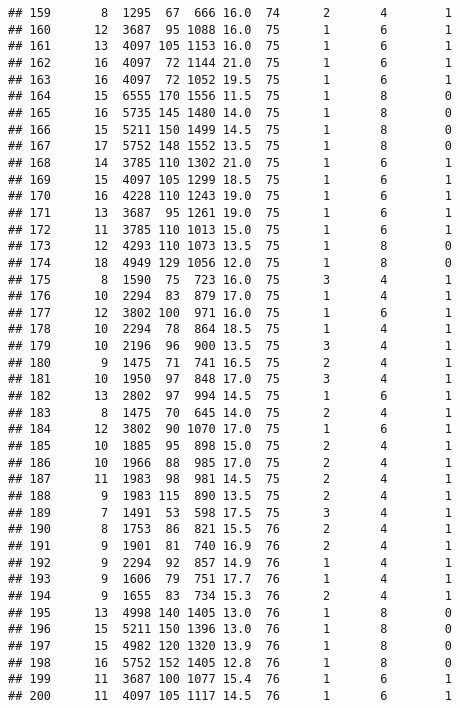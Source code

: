 \documentclass{article}\usepackage[]{graphicx}\usepackage[]{color}
\makeatletter
\newenvironment{kframe}{%
 \def\at@end@of@kframe{}%
 \ifinner\ifhmode%
  \def\at@end@of@kframe{\end{minipage}}%
  \begin{minipage}{\columnwidth}%
 \fi\fi%
 \def\FrameCommand##1{\hskip\@totalleftmargin \hskip-\fboxsep
 \colorbox{shadecolor}{##1}\hskip-\fboxsep
     \hskip-\linewidth \hskip-\@totalleftmargin \hskip\columnwidth}%
 \MakeFramed {\advance\hsize-\width
   \@totalleftmargin\z@ \linewidth\hsize
   \@setminipage}}%
 {\par\unskip\endMakeFramed%
 \at@end@of@kframe}
\newenvironment{knitrout}{}{} %
\makeatother
\begin{document}
\begin{knitrout}
\begin{kframe}
\begin{verbatim}
## 159       8  1295  67  666 16.0  74      2       4        1
## 160      12  3687  95 1088 16.0  75      1       6        1
## 161      13  4097 105 1153 16.0  75      1       6        1
## 162      16  4097  72 1144 21.0  75      1       6        1
## 163      16  4097  72 1052 19.5  75      1       6        1
## 164      15  6555 170 1556 11.5  75      1       8        0
## 165      16  5735 145 1480 14.0  75      1       8        0
## 166      15  5211 150 1499 14.5  75      1       8        0
## 167      17  5752 148 1552 13.5  75      1       8        0
## 168      14  3785 110 1302 21.0  75      1       6        1
## 169      15  4097 105 1299 18.5  75      1       6        1
## 170      16  4228 110 1243 19.0  75      1       6        1
## 171      13  3687  95 1261 19.0  75      1       6        1
## 172      11  3785 110 1013 15.0  75      1       6        1
## 173      12  4293 110 1073 13.5  75      1       8        0
## 174      18  4949 129 1056 12.0  75      1       8        0
## 175       8  1590  75  723 16.0  75      3       4        1
## 176      10  2294  83  879 17.0  75      1       4        1
## 177      12  3802 100  971 16.0  75      1       6        1
## 178      10  2294  78  864 18.5  75      1       4        1
## 179      10  2196  96  900 13.5  75      3       4        1
## 180       9  1475  71  741 16.5  75      2       4        1
## 181      10  1950  97  848 17.0  75      3       4        1
## 182      13  2802  97  994 14.5  75      1       6        1
## 183       8  1475  70  645 14.0  75      2       4        1
## 184      12  3802  90 1070 17.0  75      1       6        1
## 185      10  1885  95  898 15.0  75      2       4        1
## 186      10  1966  88  985 17.0  75      2       4        1
## 187      11  1983  98  981 14.5  75      2       4        1
## 188       9  1983 115  890 13.5  75      2       4        1
## 189       7  1491  53  598 17.5  75      3       4        1
## 190       8  1753  86  821 15.5  76      2       4        1
## 191       9  1901  81  740 16.9  76      2       4        1
## 192       9  2294  92  857 14.9  76      1       4        1
## 193       9  1606  79  751 17.7  76      1       4        1
## 194       9  1655  83  734 15.3  76      2       4        1
## 195      13  4998 140 1405 13.0  76      1       8        0
## 196      15  5211 150 1396 13.0  76      1       8        0
## 197      15  4982 120 1320 13.9  76      1       8        0
## 198      16  5752 152 1405 12.8  76      1       8        0
## 199      11  3687 100 1077 15.4  76      1       6        1
## 200      11  4097 105 1117 14.5  76      1       6        1

\end{verbatim}
\end{kframe}
\end{knitrout}
\end{document}
